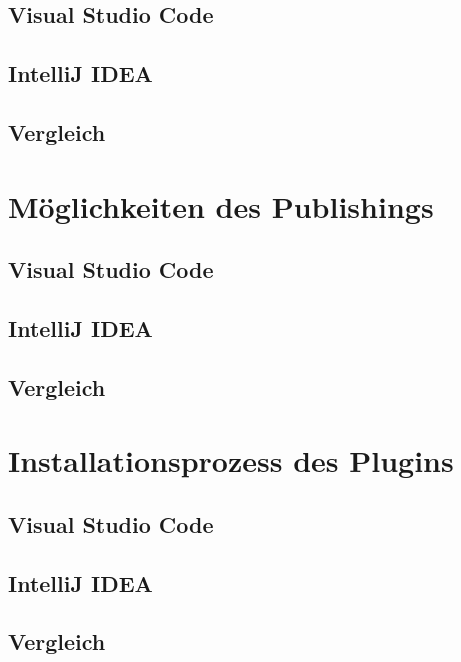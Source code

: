\subsection{Visual Studio Code}

\subsection{IntelliJ IDEA}

\subsection{Vergleich}


\section{Möglichkeiten des Publishings}
\label{sec:Vergleich_Publishing}

\subsection{Visual Studio Code}

\subsection{IntelliJ IDEA}

\subsection{Vergleich}


\section{Installationsprozess des Plugins}
\label{sec:Vergleich_Installationsprozess}

\subsection{Visual Studio Code}

\subsection{IntelliJ IDEA}

\subsection{Vergleich}
